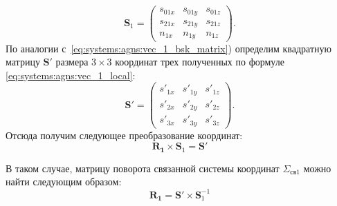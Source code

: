 \documentclass[../main.tex]{subfiles}
\begin{document}
\begin{equation}\label{eq:systems:agns:vec_1_bsk_matrix}
    \mathbf{S}_1 =
    \left(
        \begin{matrix}
            s_{01x} & s_{01y} & s_{01z} \\
            s_{21x} & s_{21y} & s_{21z} \\
            n_{1x} & n_{1y} & n_{1z}
        \end{matrix}
    \right).
\end{equation}
По аналогии с~\eqref{eq:systems:agns:vec_1_bsk_matrix}) определим квадратную матрицу $\mathbf{S}'$ размера $3 \times 3$ координат трех полученных по формуле \eqref{eq:systems:agns:vec_1_local}:
\begin{equation}\label{eq:systems:agns:vec_1_local_matrix}
    \mathbf{S}' =
    \left(
        \begin{matrix}
            s'_{1x} & s'_{1y} & s'_{1z} \\
            s'_{2x} & s'_{2y} & s'_{2z} \\
            s'_{3x} & s'_{3y} & s'_{3z}
        \end{matrix}
    \right).
\end{equation}
Отсюда получим следующее преобразование координат:
\begin{equation*}
    \mathbf{R_1} \times \mathbf{S}_1 = \mathbf{S}'
\end{equation*}

В таком случае, матрицу поворота связанной системы координат $\Sigma_{\text{св}1}$ можно найти следующим образом:
\begin{equation*}
    \mathbf{R_1} = \mathbf{S}' \times \mathbf{S}_1^{-1}
\end{equation*}
\end{document}
